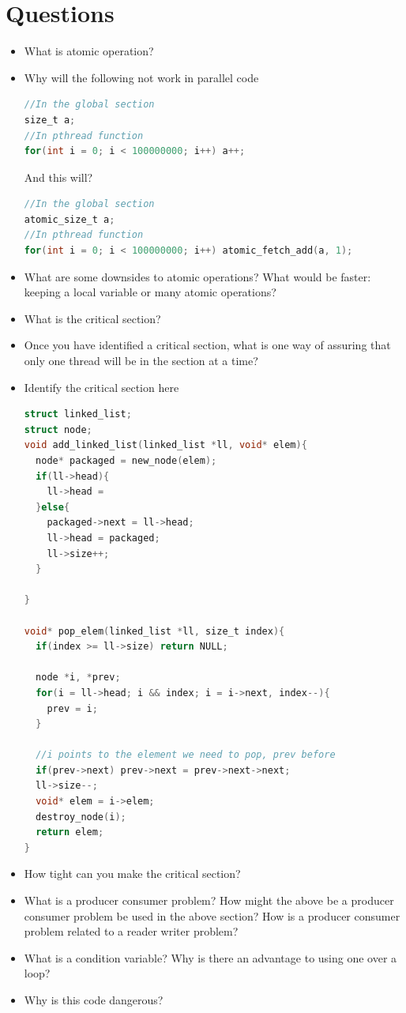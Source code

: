 \section{Questions}

\begin{itemize}
\tightlist
\item
  What is atomic operation?
\item
  Why will the following not work in parallel code

\begin{lstlisting}[language=C]
//In the global section
size_t a;
//In pthread function
for(int i = 0; i < 100000000; i++) a++;
\end{lstlisting}

  And this will?

\begin{lstlisting}[language=C]
//In the global section
atomic_size_t a;
//In pthread function
for(int i = 0; i < 100000000; i++) atomic_fetch_add(a, 1);
\end{lstlisting}
\item
  What are some downsides to atomic operations? What would be faster: keeping a local variable or many atomic operations?
\item
  What is the critical section?
\item
  Once you have identified a critical section, what is one way of assuring that only one thread will be in the section at a time?
\item
  Identify the critical section here

\begin{lstlisting}[language=C]
struct linked_list;
struct node;
void add_linked_list(linked_list *ll, void* elem){
  node* packaged = new_node(elem);
  if(ll->head){
    ll->head =
  }else{
    packaged->next = ll->head;
    ll->head = packaged;
    ll->size++;
  }

}

void* pop_elem(linked_list *ll, size_t index){
  if(index >= ll->size) return NULL;

  node *i, *prev;
  for(i = ll->head; i && index; i = i->next, index--){
    prev = i;
  }

  //i points to the element we need to pop, prev before
  if(prev->next) prev->next = prev->next->next;
  ll->size--;
  void* elem = i->elem;
  destroy_node(i);
  return elem;
}
\end{lstlisting}

\item How tight can you make the critical section?
\item What is a producer consumer problem? How might the above be a producer consumer problem be used in the above section? How is a producer consumer problem related to a reader writer problem?
\item What is a condition variable? Why is there an advantage to using one over a  loop?
\item Why is this code dangerous?


\end{itemize}

